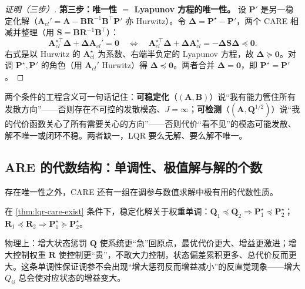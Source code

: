 \begin{proof}[证明（三步）]
\textbf{第三步：唯一性 $=$ Lyapunov 方程的唯一性。}\;
设 $\mathbf P'$ 是另一稳定化解（$\mathbf A_{cl}'=\mathbf A-\mathbf B\mathbf R^{-1}\mathbf B^\top\mathbf P'$ 亦 Hurwitz）。令 $\boldsymbol\Delta=\mathbf P^\star-\mathbf P'$，两个 CARE 相减并整理（用 $\mathbf S=\mathbf B\mathbf R^{-1}\mathbf B^\top$）：
\begin{equation}
  \mathbf A_{cl}^{\star\top}\boldsymbol\Delta+\boldsymbol\Delta\mathbf A_{cl}'=\mathbf0
  \quad\Longleftrightarrow\quad
  \mathbf A_{cl}^{\star\top}\boldsymbol\Delta+\boldsymbol\Delta\mathbf A_{cl}^\star=-\boldsymbol\Delta\mathbf S\boldsymbol\Delta\preceq\mathbf0.
  \label{eq:lqr-uniq}
\end{equation}
右式是以 Hurwitz 的 $\mathbf A_{cl}^\star$ 为系数、右端半负定的 Lyapunov 方程，故 $\boldsymbol\Delta\succeq\mathbf0$。对调 $\mathbf P^\star,\mathbf P'$ 的角色（用 $\mathbf A_{cl}'$ Hurwitz）得 $\boldsymbol\Delta\preceq\mathbf0$。两者合并 $\boldsymbol\Delta=\mathbf0$，即 $\mathbf P^\star=\mathbf P'$。
\end{proof}

\begin{insight}
两个条件的工程含义可一句话记住：\textbf{可稳定化}（$(\mathbf A,\mathbf B)$）说“我有能力管住所有发散方向”——否则存在不可控的发散模态、$J=\infty$；\textbf{可检测}（$(\mathbf A,\mathbf Q^{1/2})$）说“我的代价函数关心了所有需要关心的方向”——否则代价“看不见”的模态可能发散、解不唯一或闭环不稳。两者缺一，LQR 要么无解、要么解不唯一。
\end{insight}

\subsection{ARE 的代数结构：单调性、极值解与解的个数}
\label{sec:lqr-are-structure}

存在唯一性之外，CARE 还有一组在调参与数值求解中极有用的代数性质。

\begin{theorem}\label{thm:lqr-monotone}
在 \cref{thm:lqr-care-exist} 条件下，稳定化解关于权重单调：$\mathbf Q_1\preceq\mathbf Q_2\Rightarrow\mathbf P_1^\star\preceq\mathbf P_2^\star$；$\mathbf R_1\preceq\mathbf R_2\Rightarrow\mathbf P_1^\star\succeq\mathbf P_2^\star$。
\end{theorem}

物理上：增大状态惩罚 $\mathbf Q$ 使系统更“急”回原点，最优代价更大、增益更激进；增大控制权重 $\mathbf R$ 使控制更“贵”，不敢大力控制，状态偏差累积更多、总代价反而更大。这条单调性保证调参不会出现“增大惩罚反而增益减小”的反直觉现象——增大 $Q_{ii}$ 总会使对应状态的增益变大。

